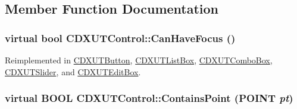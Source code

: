 \subsection{Member Function Documentation}
\hypertarget{class_c_d_x_u_t_control_a5b2c6c474236a79b257c86caded9c0b7}{
\subsubsection[{CanHaveFocus}]{\setlength{\rightskip}{0pt plus 5cm}virtual bool CDXUTControl::CanHaveFocus ()}}
\label{class_c_d_x_u_t_control_a5b2c6c474236a79b257c86caded9c0b7}


Reimplemented in \hyperlink{class_c_d_x_u_t_button_a81d210561344736cca99976a8c8e6d57}{CDXUTButton}, \hyperlink{class_c_d_x_u_t_list_box_adbe71e402fd89d6382b60a35b34c0fa9}{CDXUTListBox}, \hyperlink{class_c_d_x_u_t_combo_box_a274c5f85816abf1d040ea1606bd3447c}{CDXUTComboBox}, \hyperlink{class_c_d_x_u_t_slider_afbda40a898fbc1424759bc530899475d}{CDXUTSlider}, and \hyperlink{class_c_d_x_u_t_edit_box_a988225899327c419d70d013ed6ab113a}{CDXUTEditBox}.\hypertarget{class_c_d_x_u_t_control_a9b4410bbd1cac9a0ffce760aaa9a2d48}{
\subsubsection[{ContainsPoint}]{\setlength{\rightskip}{0pt plus 5cm}virtual BOOL CDXUTControl::ContainsPoint (POINT {\em pt})}}
\label{class_c_d_x_u_t_control_a9b4410bbd1cac9a0ffce760aaa9a2d48}


